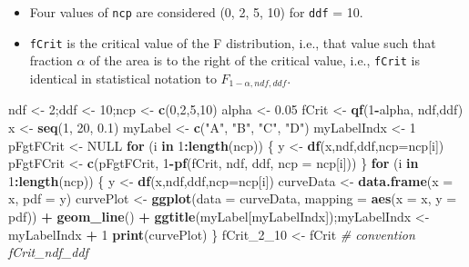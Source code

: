 \documentclass[
]{book}
\newenvironment{Shaded}{\begin{snugshade}}{\end{snugshade}}
\newcommand{\CommentTok}[1]{\textcolor[rgb]{0.56,0.35,0.01}{\textit{#1}}}
\newcommand{\ControlFlowTok}[1]{\textcolor[rgb]{0.13,0.29,0.53}{\textbf{#1}}}
\newcommand{\DataTypeTok}[1]{\textcolor[rgb]{0.13,0.29,0.53}{#1}}
\newcommand{\DecValTok}[1]{\textcolor[rgb]{0.00,0.00,0.81}{#1}}
\newcommand{\FloatTok}[1]{\textcolor[rgb]{0.00,0.00,0.81}{#1}}
\newcommand{\KeywordTok}[1]{\textcolor[rgb]{0.13,0.29,0.53}{\textbf{#1}}}
\newcommand{\NormalTok}[1]{#1}
\newcommand{\OperatorTok}[1]{\textcolor[rgb]{0.81,0.36,0.00}{\textbf{#1}}}
\newcommand{\OtherTok}[1]{\textcolor[rgb]{0.56,0.35,0.01}{#1}}
\newcommand{\StringTok}[1]{\textcolor[rgb]{0.31,0.60,0.02}{#1}}
\providecommand{\tightlist}{%
  \setlength{\itemsep}{0pt}\setlength{\parskip}{0pt}}
\begin{document}
\begin{itemize}
\tightlist
\item
  Four values of \texttt{ncp} are considered (0, 2, 5, 10) for \texttt{ddf} = 10.
\item
  \texttt{fCrit} is the critical value of the F distribution, i.e., that value such that fraction \(\alpha\) of the area is to the right of the critical value, i.e., \texttt{fCrit} is identical in statistical notation to \({{F}_{1-\alpha ,ndf,ddf}}\).
\end{itemize}

\begin{Shaded}
\begin{Highlighting}[]
\NormalTok{ndf <-}\StringTok{ }\DecValTok{2}\NormalTok{;ddf <-}\StringTok{ }\DecValTok{10}\NormalTok{;ncp <-}\StringTok{ }\KeywordTok{c}\NormalTok{(}\DecValTok{0}\NormalTok{,}\DecValTok{2}\NormalTok{,}\DecValTok{5}\NormalTok{,}\DecValTok{10}\NormalTok{)}
\NormalTok{alpha <-}\StringTok{ }\FloatTok{0.05}
\NormalTok{fCrit <-}\StringTok{ }\KeywordTok{qf}\NormalTok{(}\DecValTok{1}\OperatorTok{-}\NormalTok{alpha, ndf,ddf)}
\NormalTok{x <-}\StringTok{ }\KeywordTok{seq}\NormalTok{(}\DecValTok{1}\NormalTok{, }\DecValTok{20}\NormalTok{, }\FloatTok{0.1}\NormalTok{)}
\NormalTok{myLabel <-}\StringTok{ }\KeywordTok{c}\NormalTok{(}\StringTok{"A"}\NormalTok{, }\StringTok{"B"}\NormalTok{, }\StringTok{"C"}\NormalTok{, }\StringTok{"D"}\NormalTok{)}
\NormalTok{myLabelIndx <-}\StringTok{ }\DecValTok{1}
\NormalTok{pFgtFCrit <-}\StringTok{ }\OtherTok{NULL}
\ControlFlowTok{for}\NormalTok{ (i }\ControlFlowTok{in} \DecValTok{1}\OperatorTok{:}\KeywordTok{length}\NormalTok{(ncp))}
\NormalTok{\{}
\NormalTok{  y <-}\StringTok{ }\KeywordTok{df}\NormalTok{(x,ndf,ddf,}\DataTypeTok{ncp=}\NormalTok{ncp[i])}
\NormalTok{  pFgtFCrit <-}\StringTok{ }\KeywordTok{c}\NormalTok{(pFgtFCrit, }\DecValTok{1}\OperatorTok{-}\KeywordTok{pf}\NormalTok{(fCrit, ndf, ddf, }\DataTypeTok{ncp =}\NormalTok{ ncp[i]))}
\NormalTok{\}  }
\ControlFlowTok{for}\NormalTok{ (i }\ControlFlowTok{in} \DecValTok{1}\OperatorTok{:}\KeywordTok{length}\NormalTok{(ncp))}
\NormalTok{\{}
\NormalTok{  y <-}\StringTok{ }\KeywordTok{df}\NormalTok{(x,ndf,ddf,}\DataTypeTok{ncp=}\NormalTok{ncp[i])}
\NormalTok{  curveData <-}\StringTok{ }\KeywordTok{data.frame}\NormalTok{(}\DataTypeTok{x =}\NormalTok{ x, }\DataTypeTok{pdf =}\NormalTok{ y)}
\NormalTok{  curvePlot <-}\StringTok{ }\KeywordTok{ggplot}\NormalTok{(}\DataTypeTok{data =}\NormalTok{ curveData, }\DataTypeTok{mapping =} \KeywordTok{aes}\NormalTok{(}\DataTypeTok{x =}\NormalTok{ x, }\DataTypeTok{y =}\NormalTok{ pdf)) }\OperatorTok{+}\StringTok{ }
\StringTok{    }\KeywordTok{geom_line}\NormalTok{() }\OperatorTok{+}
\StringTok{    }\KeywordTok{ggtitle}\NormalTok{(myLabel[myLabelIndx]);myLabelIndx <-}\StringTok{ }\NormalTok{myLabelIndx }\OperatorTok{+}\StringTok{ }\DecValTok{1}
  \KeywordTok{print}\NormalTok{(curvePlot)}
\NormalTok{\}}
\NormalTok{fCrit_}\DecValTok{2}\NormalTok{_}\DecValTok{10}\NormalTok{ <-}\StringTok{ }\NormalTok{fCrit }\CommentTok{# convention fCrit_ndf_ddf}
\end{Highlighting}
\end{Shaded}
\end{document}
